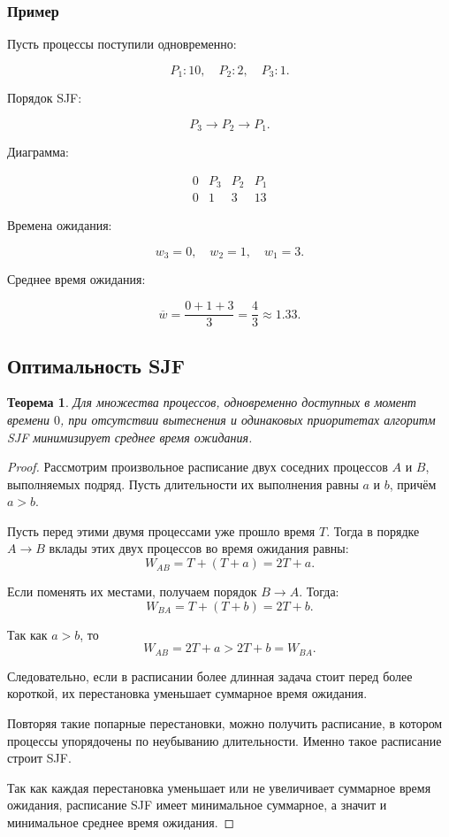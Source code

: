\documentclass[12pt,a4paper]{article}
\newtheorem{theorem}{Теорема}
\begin{document}
\subsubsection*{Пример}

Пусть процессы поступили одновременно:

\[
P_1: 10,\quad P_2: 2,\quad P_3: 1.
\]

Порядок SJF:

\[
P_3 \rightarrow P_2 \rightarrow P_1.
\]

Диаграмма:

\[
\begin{array}{c|c|c|c}
0 & P_3 & P_2 & P_1 \\
\hline
0 & 1 & 3 & 13
\end{array}
\]

Времена ожидания:

\[
w_3 = 0,\quad w_2 = 1,\quad w_1 = 3.
\]

Среднее время ожидания:

\[
\overline{w} = \frac{0 + 1 + 3}{3} = \frac{4}{3} \approx 1.33.
\]

\subsection{Оптимальность SJF}

\begin{theorem}
Для множества процессов, одновременно доступных в момент времени $0$, при отсутствии вытеснения и одинаковых приоритетах алгоритм SJF минимизирует среднее время ожидания.
\end{theorem}

\begin{proof}
Рассмотрим произвольное расписание двух соседних процессов $A$ и $B$, выполняемых подряд. Пусть длительности их выполнения равны $a$ и $b$, причём $a > b$.

Пусть перед этими двумя процессами уже прошло время $T$. Тогда в порядке $A \rightarrow B$ вклады этих двух процессов во время ожидания равны:
\[
W_{AB} = T + (T + a) = 2T + a.
\]

Если поменять их местами, получаем порядок $B \rightarrow A$. Тогда:
\[
W_{BA} = T + (T + b) = 2T + b.
\]

Так как $a > b$, то
\[
W_{AB} = 2T + a > 2T + b = W_{BA}.
\]

Следовательно, если в расписании более длинная задача стоит перед более короткой, их перестановка уменьшает суммарное время ожидания.

Повторяя такие попарные перестановки, можно получить расписание, в котором процессы упорядочены по неубыванию длительности. Именно такое расписание строит SJF.

Так как каждая перестановка уменьшает или не увеличивает суммарное время ожидания, расписание SJF имеет минимальное суммарное, а значит и минимальное среднее время ожидания.
\end{proof}
\end{document}
